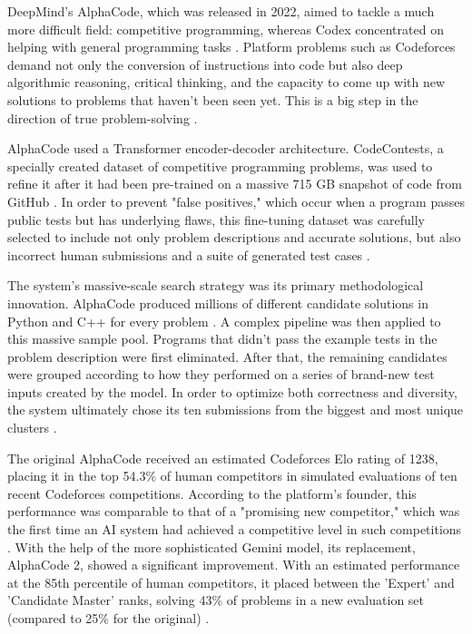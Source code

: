 \documentclass[12pt, a4paper]{report}
\begin{document}
DeepMind's AlphaCode, which was released in 2022, aimed to tackle a much more difficult field: competitive programming, whereas Codex concentrated on helping with general programming tasks \citep{li2022competition}. Platform problems such as Codeforces demand not only the conversion of instructions into code but also deep algorithmic reasoning, critical thinking, and the capacity to come up with new solutions to problems that haven't been seen yet. This is a big step in the direction of true problem-solving \citep{li2022competition}.

AlphaCode used a Transformer encoder-decoder architecture. CodeContests, a specially created dataset of competitive programming problems, was used to refine it after it had been pre-trained on a massive 715 GB snapshot of code from GitHub \citep{li2022competition}. In order to prevent "false positives," which occur when a program passes public tests but has underlying flaws, this fine-tuning dataset was carefully selected to include not only problem descriptions and accurate solutions, but also incorrect human submissions and a suite of generated test cases \citep{li2022competition}.

The system's massive-scale search strategy was its primary methodological innovation. AlphaCode produced millions of different candidate solutions in Python and C++ for every problem \citep{li2022competition}. A complex pipeline was then applied to this massive sample pool. Programs that didn't pass the example tests in the problem description were first eliminated. After that, the remaining candidates were grouped according to how they performed on a series of brand-new test inputs created by the model. In order to optimize both correctness and diversity, the system ultimately chose its ten submissions from the biggest and most unique clusters \citep{li2022competition}.

The original AlphaCode received an estimated Codeforces Elo rating of 1238, placing it in the top 54.3\% of human competitors in simulated evaluations of ten recent Codeforces competitions. According to the platform's founder, this performance was comparable to that of a "promising new competitor," which was the first time an AI system had achieved a competitive level in such competitions \citep{li2022competition}. With the help of the more sophisticated Gemini model, its replacement, AlphaCode 2, showed a significant improvement. With an estimated performance at the 85th percentile of human competitors, it placed between the 'Expert' and 'Candidate Master' ranks, solving 43\% of problems in a new evaluation set (compared to 25\% for the original) \citep{alphacode2_2023}.
\end{document}
